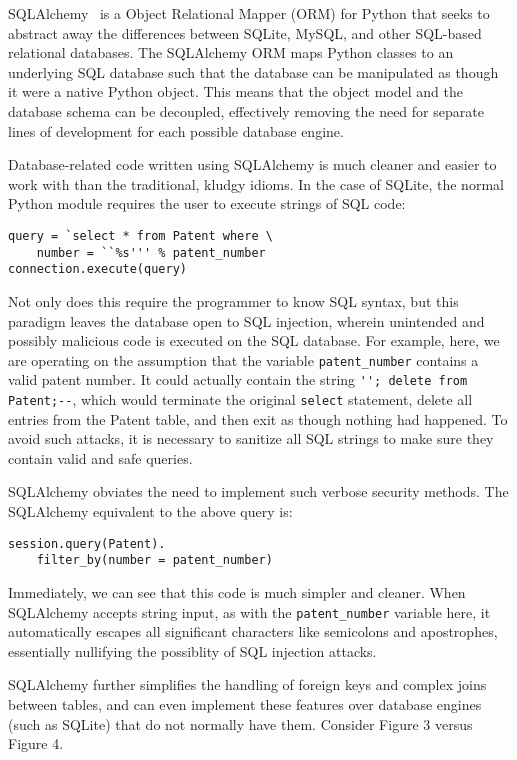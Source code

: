SQLAlchemy~\cite{sqlalchemy} is a Object Relational Mapper (ORM)
for Python that seeks to abstract away the differences between SQLite,
MySQL, and other SQL-based relational databases. The SQLAlchemy ORM
maps Python classes to an underlying SQL database such that the database
can be manipulated as though it were a native Python object. This
means that the object model and the database schema can be decoupled,
effectively removing the need for separate lines of development for
each possible database engine.

Database-related code written using SQLAlchemy is much cleaner and
easier to work with than the traditional, kludgy idioms. In the case
of SQLite, the normal Python module requires the user to execute strings
of SQL code: 
\begin{lstlisting}
query = `select * from Patent where \
    number = ``%s''' % patent_number
connection.execute(query)
\end{lstlisting}


Not only does this require the programmer to know SQL syntax, but
this paradigm leaves the database open to SQL injection, wherein unintended
and possibly malicious code is executed on the SQL database. For example,
here, we are operating on the assumption that the variable \verb`patent_number`
contains a valid patent number. It could actually contain the string
\verb`''; delete from Patent;--`, which would terminate the original
\verb`select` statement, delete all entries from the Patent table,
and then exit as though nothing had happened. To avoid such attacks,
it is necessary to sanitize all SQL strings to make sure they contain
valid and safe queries.

SQLAlchemy obviates the need to implement such verbose security methods.
The SQLAlchemy equivalent to the above query is:

\begin{lstlisting}
session.query(Patent).
    filter_by(number = patent_number)
\end{lstlisting}


Immediately, we can see that this code is much simpler and cleaner.
When SQLAlchemy accepts string input, as with the \verb`patent_number`
variable here, it automatically escapes all significant characters
like semicolons and apostrophes, essentially nullifying the possiblity
of SQL injection attacks.

SQLAlchemy further simplifies the handling of foreign keys and complex
joins between tables, and can even implement these features over database
engines (such as SQLite) that do not normally have them. Consider
Figure 3 versus Figure 4.


